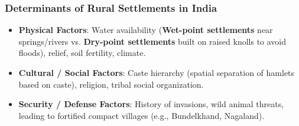 \documentclass[11pt,a4paper]{article}
\begin{document}
\subsubsection{Determinants of Rural Settlements in India}
\begin{itemize}[leftmargin=*]
  \item \textbf{Physical Factors}: Water availability (\textbf{Wet-point settlements} near springs/rivers vs. \textbf{Dry-point settlements} built on raised knolls to avoid floods), relief, soil fertility, climate.
  \item \textbf{Cultural / Social Factors}: Caste hierarchy (spatial separation of hamlets based on caste), religion, tribal social organization.
  \item \textbf{Security / Defense Factors}: History of invasions, wild animal threats, leading to fortified compact villages (e.g., Bundelkhand, Nagaland).
\end{itemize}
\end{document}
